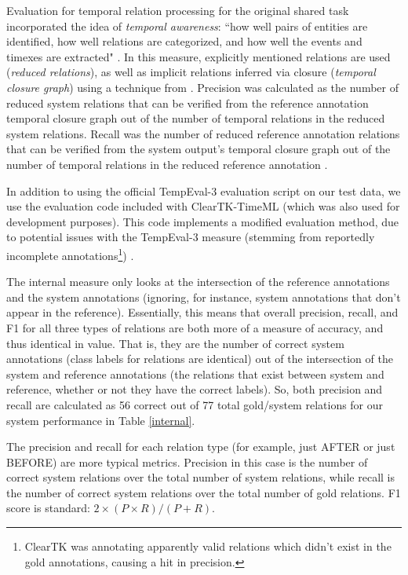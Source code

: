 \documentclass[11pt]{article}
\begin{document}
Evaluation for temporal relation processing for the original shared task incorporated the idea of \emph{temporal awareness}: ``how well pairs of entities are identified, how well relations are categorized, and how well the events and timexes are extracted" \cite{UzZaman:13}. In this measure, explicitly mentioned relations are used (\emph{reduced relations}), as well as implicit relations inferred via closure (\emph{temporal closure graph}) using a technique from . Precision was calculated as the number of reduced system relations that can be verified from the reference annotation temporal closure graph out of the number of temporal relations in the reduced system relations. Recall was the number of reduced reference annotation relations that can be verified from the system output's temporal closure graph out of the number of temporal relations in the reduced reference annotation \cite{UzZaman:13}.

In addition to using the official TempEval-3 evaluation script on our test data, we use the evaluation code included with ClearTK-TimeML (which was also used for development purposes). This code implements a modified evaluation method, due to potential issues with the TempEval-3 measure (stemming from reportedly incomplete annotations\footnote{ClearTK was annotating apparently valid relations which didn't exist in the gold annotations, causing a hit in precision.}) \cite{Bethard:13}.

The internal measure only looks at the intersection of the reference annotations and the system annotations (ignoring, for instance, system annotations that don't appear in the reference). Essentially, this means that overall precision, recall, and F1 for all three types of relations are both more of a measure of accuracy, and thus identical in value. That is, they are the number of correct system annotations (class labels for relations are identical) out of the intersection of the system and reference annotations (the relations that exist between system and reference, whether or not they have the correct labels). So, both precision and recall are calculated as 56 correct out of 77 total gold/system relations for our system performance in Table \ref{internal}.

The precision and recall for each relation type (for example, just AFTER or just BEFORE) are more typical metrics. Precision in this case is the number of correct system relations over the total number of system relations, while recall is the number of correct system relations over the total number of gold relations. F1 score is standard: $2 \times (P \times R)/(P + R)$.
\end{document}
